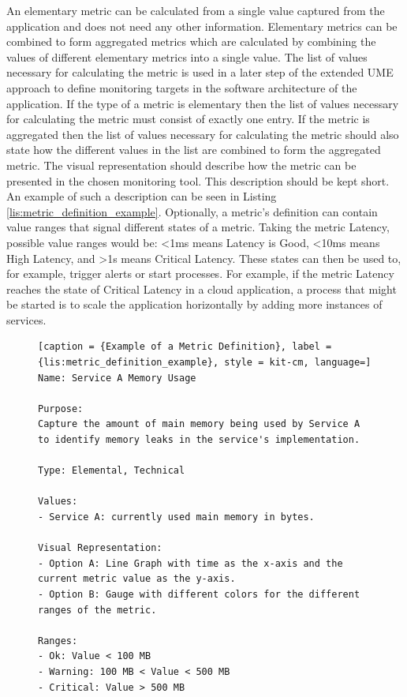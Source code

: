 An elementary metric can be calculated from a single value captured from the application and does not
need any other information. Elementary metrics can be combined to form aggregated metrics
which are calculated by combining the values of different elementary metrics into a single value.
The list of values necessary for calculating the metric is used in a later step
of the extended UME approach to define monitoring targets in the software architecture of the application.
If the type of a metric is elementary then the list of values necessary for calculating the metric
must consist of exactly one entry. If the metric is aggregated then the list of values necessary for calculating
the metric should also state how the different values in the list are combined to form the aggregated metric.
The visual representation should describe how the metric can be presented in the chosen monitoring tool.
This description should be kept short. An example of such a description can be seen in Listing \ref{lis:metric_definition_example}.
Optionally, a metric's definition can contain value ranges that signal different states of a metric.
Taking the metric Latency, possible value ranges would be: <1ms means Latency is Good, <10ms means High Latency,
and >1s means Critical Latency. These states can then be used to, for example, trigger alerts or start
processes. For example, if the metric Latency reaches the state of Critical Latency in a cloud application,
a process that might be started is to scale the application horizontally by adding more instances of services.

\begin{figure}[tb]
\begin{lstlisting}[caption = {Example of a Metric Definition}, label = {lis:metric_definition_example}, style = kit-cm, language=]
Name: Service A Memory Usage

Purpose:
Capture the amount of main memory being used by Service A
to identify memory leaks in the service's implementation.

Type: Elemental, Technical

Values:
- Service A: currently used main memory in bytes.

Visual Representation:
- Option A: Line Graph with time as the x-axis and the current metric value as the y-axis.
- Option B: Gauge with different colors for the different ranges of the metric.

Ranges:
- Ok: Value < 100 MB
- Warning: 100 MB < Value < 500 MB
- Critical: Value > 500 MB
\end{lstlisting}
\end{figure}

